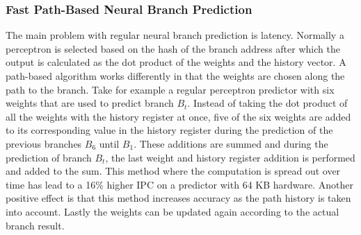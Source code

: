 \subsubsection{Fast Path-Based Neural Branch Prediction}
The main problem with regular neural branch prediction is latency. Normally a perceptron is selected based on the hash of the branch address after which the output is calculated as the dot product of the weights and the history vector. A path-based algorithm works differently in that the weights are chosen along the path to the branch. Take for example a regular perceptron predictor with six weights that are used to predict branch $B_t$. Instead of taking the dot product of all the weights with the history register at once, five of the six weights are added to its corresponding value in the history register during the prediction of the previous branches $B_6$ until $B_1$. These additions are summed and during the prediction of branch $B_t$, the last weight and history register addition is performed and added to the sum. This method where the computation is spread out over time has lead to a 16\% higher IPC on a predictor with 64 KB hardware. Another positive effect is that this method increases accuracy as the path history is taken into account. Lastly the weights can be updated again according to the actual branch result.